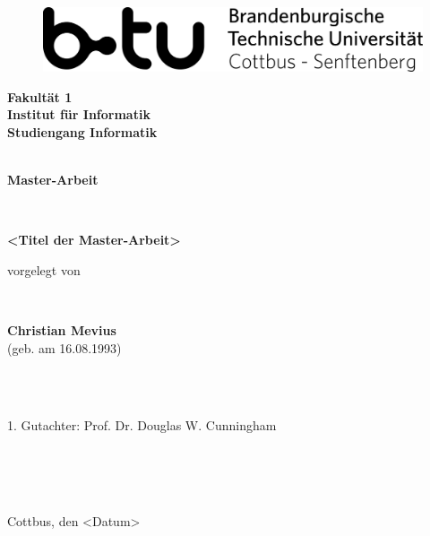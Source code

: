 \begin{titlepage}
	\begin{center}
		\ \\
	\begin{figure}[ht]
		\center\includegraphics[scale=2]{img/logo}
	\end{figure}
		\vfill
		\Large \textbf{Fakultät 1 \\ Institut für Informatik \\ Studiengang Informatik}
		\ \\
		\ \\
		\vfill
		{\Huge \textbf{Master-Arbeit} \par}	
		\ \\
		\vfill
		{\Large \textbf{<Titel der Master-Arbeit>}
		\par}
		\vfill
		{\normalsize{vorgelegt von}\par}
		\ \\
		\vfill
		{\Large \textbf{Christian Mevius} \ \\
						\normalsize{(geb. am 16.08.1993)}
		\par}
		\ \\
		
		\ \\
	\end{center}
	\vfill	
	{\normalsize{1. Gutachter: Prof. Dr. Douglas W. Cunningham}\par}
		\ \\
		\ \\
		\ \\
	{\normalsize{Cottbus, den <Datum>}\par}
\end{titlepage}